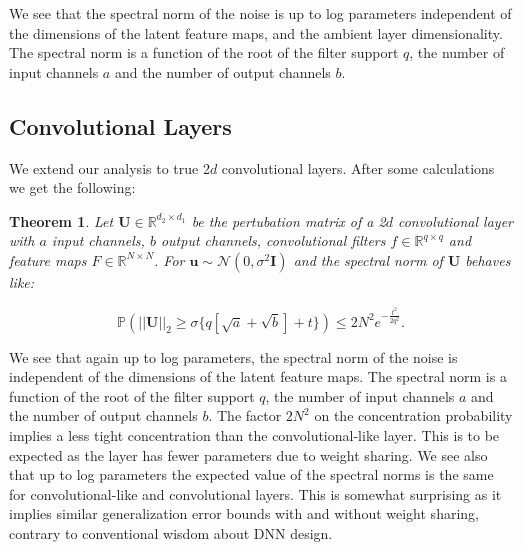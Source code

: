 \documentclass{article} %
\newtheorem{theorem}{Theorem}[section]
\theoremstyle{definition}
\begin{document}
We see that the spectral norm of the noise is up to log parameters independent of the dimensions of the latent feature maps, and the ambient layer dimensionality. The spectral norm is a function of the root of the filter support $q$, the number of input channels $a$ and the number of output channels $b$.  

\subsection{Convolutional Layers}
We extend our analysis to true 2$d$ convolutional layers. After some calculations we get the following:
\begin{theorem}
Let $\boldsymbol{U} \in \mathbb{R}^{d_2 \times d_1}$ be the pertubation matrix of a 2$d$ convolutional layer with $a$ input channels, $b$ output channels, convolutional filters $f \in \mathbb{R}^{q \times q}$ and feature maps $F \in \mathbb{R}^{N \times N}$. For $\boldsymbol{u} \sim \mathcal{N}(0,\sigma^2 \boldsymbol{I})$ and  the spectral norm of $\boldsymbol{U}$ behaves like:


\begin{equation}
\mathbb{P}(||\boldsymbol{U}||_2 \geq \sigma  \{q [\sqrt{a} + \sqrt{b}] + t \}   ) \leq 2N^2e^{-\frac{t^2}{2q^2}}.
\end{equation}
\end{theorem}

We see that again up to log parameters, the spectral norm of the noise is independent of the dimensions of the latent feature maps. The spectral norm is a function of the root of the filter support $q$, the number of input channels $a$ and the number of output channels $b$.  The factor $2N^2$ on the concentration probability implies a less tight concentration than the convolutional-like layer. This is to be expected as the layer has fewer parameters due to weight sharing. We see also that up to log parameters the expected value of the spectral norms is the same for convolutional-like and convolutional layers. This is somewhat surprising as it implies similar generalization error bounds with and without weight sharing, contrary to conventional wisdom about DNN design. %
\end{document}
